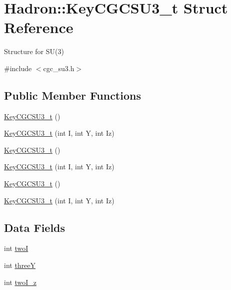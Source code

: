 \hypertarget{structHadron_1_1KeyCGCSU3__t}{}\section{Hadron\+:\+:Key\+C\+G\+C\+S\+U3\+\_\+t Struct Reference}
\label{structHadron_1_1KeyCGCSU3__t}


Structure for S\+U(3)  




{\ttfamily \#include $<$cgc\+\_\+su3.\+h$>$}

\subsection*{Public Member Functions}
\begin{DoxyCompactItemize}
\item 
\mbox{\hyperlink{structHadron_1_1KeyCGCSU3__t_a54336691c05ca5cdc4d34e5bf63a9ad3}{Key\+C\+G\+C\+S\+U3\+\_\+t}} ()
\item 
\mbox{\hyperlink{structHadron_1_1KeyCGCSU3__t_a1b0584c75fa2b450db1e3ad40d7422a2}{Key\+C\+G\+C\+S\+U3\+\_\+t}} (int I, int Y, int Iz)
\item 
\mbox{\hyperlink{structHadron_1_1KeyCGCSU3__t_a54336691c05ca5cdc4d34e5bf63a9ad3}{Key\+C\+G\+C\+S\+U3\+\_\+t}} ()
\item 
\mbox{\hyperlink{structHadron_1_1KeyCGCSU3__t_a1b0584c75fa2b450db1e3ad40d7422a2}{Key\+C\+G\+C\+S\+U3\+\_\+t}} (int I, int Y, int Iz)
\item 
\mbox{\hyperlink{structHadron_1_1KeyCGCSU3__t_a54336691c05ca5cdc4d34e5bf63a9ad3}{Key\+C\+G\+C\+S\+U3\+\_\+t}} ()
\item 
\mbox{\hyperlink{structHadron_1_1KeyCGCSU3__t_a1b0584c75fa2b450db1e3ad40d7422a2}{Key\+C\+G\+C\+S\+U3\+\_\+t}} (int I, int Y, int Iz)
\end{DoxyCompactItemize}
\subsection*{Data Fields}
\begin{DoxyCompactItemize}
\item 
int \mbox{\hyperlink{structHadron_1_1KeyCGCSU3__t_a0c1919df3ee3e6a2a98899d4949f7821}{twoI}}
\item 
int \mbox{\hyperlink{structHadron_1_1KeyCGCSU3__t_ab257467df495ae17d64e36cb79cb5a91}{threeY}}
\item 
int \mbox{\hyperlink{structHadron_1_1KeyCGCSU3__t_a2327b80f179837e064ee74a124d58ee9}{two\+I\+\_\+z}}
\end{DoxyCompactItemize}


